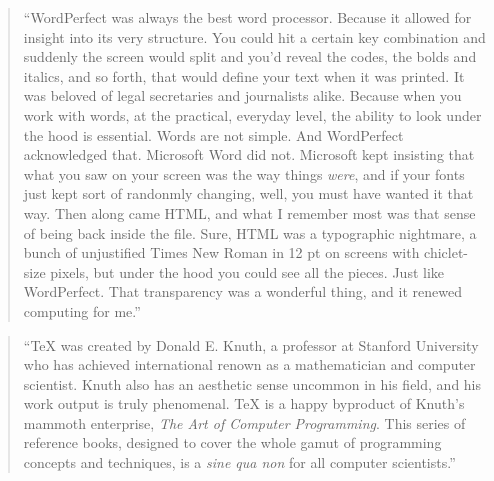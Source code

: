 \documentclass[]{tufte-book}
\begin{document}
\begin{quote}
``WordPerfect was always the best word processor. Because it allowed for insight into
its very structure. You could hit a certain key combination and suddenly the screen
would split and you'd reveal the codes, the bolds and italics, and so forth,
that would define your text when it was printed. It was beloved of legal secretaries
and journalists alike. Because when you work with words, at the practical, everyday
level, the ability to look under the hood is essential. Words are not simple. And
WordPerfect acknowledged that. Microsoft Word did not. Microsoft kept insisting that
what you saw on your screen was the way things \emph{were}, and if your fonts just kept
sort of randonmly changing, well, you must have wanted it that way. Then along came
HTML, and what I remember most was that sense of being back inside the file. Sure,
HTML was a typographic nightmare, a bunch of unjustified Times New Roman in 12 pt on
screens with chiclet-size pixels, but under the hood you could see all the pieces.
Just like WordPerfect. That transparency was a wonderful thing, and it renewed
computing for me.'' \citep{ford2015on}
\end{quote}

\begin{quote}
``TeX was created by Donald E. Knuth, a professor at Stanford University who has
achieved international renown as a mathematician and computer scientist.
Knuth also has an aesthetic sense uncommon in his field, and his work output is
truly phenomenal. TeX is a happy byproduct of Knuth's mammoth enterprise,
\emph{The Art of Computer Programming}. This series of reference books, designed
to cover the whole gamut of programming concepts and techniques, is a
\emph{sine qua non} for all computer scientists.'' \citep{seroul2012beginner}
\end{quote}
\end{document}
